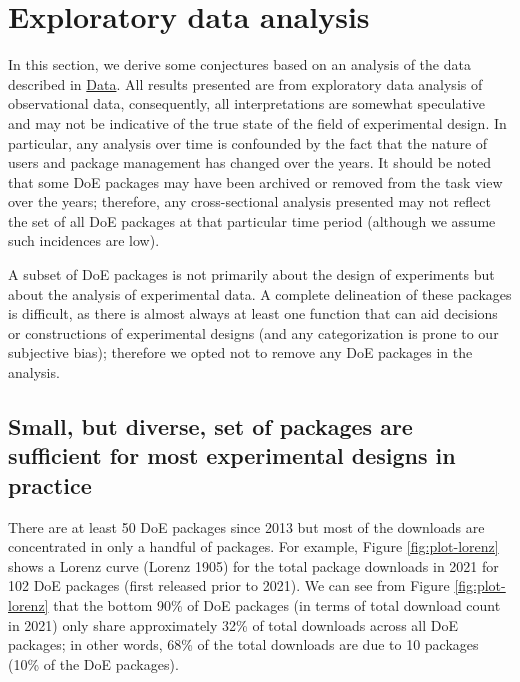 \hypertarget{eda}{%
\section{Exploratory data analysis}\label{eda}}

In this section, we derive some conjectures based on an analysis of the data described in \hyperref[data]{Data}. All results presented are from exploratory data analysis of observational data, consequently, all interpretations are somewhat speculative and may not be indicative of the true state of the field of experimental design. In particular, any analysis over time is confounded by the fact that the nature of users and package management has changed over the years. It should be noted that some DoE packages may have been archived or removed from the task view over the years; therefore, any cross-sectional analysis presented may not reflect the set of all DoE packages at that particular time period (although we assume such incidences are low).

A subset of DoE packages is not primarily about the design of experiments but about the analysis of experimental data. A complete delineation of these packages is difficult, as there is almost always at least one function that can aid decisions or constructions of experimental designs (and any categorization is prone to our subjective bias); therefore we opted not to remove any DoE packages in the analysis.

\hypertarget{small-but-diverse-set-of-packages-are-sufficient-for-most-experimental-designs-in-practice}{%
\subsection{Small, but diverse, set of packages are sufficient for most experimental designs in practice}\label{small-but-diverse-set-of-packages-are-sufficient-for-most-experimental-designs-in-practice}}

There are at least 50 DoE packages since 2013 but most of the downloads are concentrated in only a handful of packages. For example, Figure \ref{fig:plot-lorenz} shows a Lorenz curve (Lorenz 1905) for the total package downloads in 2021 for 102 DoE packages (first released prior to 2021). We can see from Figure \ref{fig:plot-lorenz} that the bottom 90\% of DoE packages (in terms of total download count in 2021) only share approximately 32\% of total downloads across all DoE packages; in other words, 68\% of the total downloads are due to 10 packages (10\% of the DoE packages).

